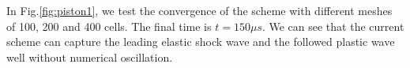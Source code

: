 \documentclass{article}
\numberwithin{equation}{section}
\numberwithin{table}{section}
\begin{document}
In Fig.\ref{fig:piston1}, we test the convergence of the scheme with different meshes of 100, 200 and 400 cells. The final time is $t = 150 \mu s $.  We can  see that the current scheme can capture the leading elastic shock wave and the followed plastic wave well without numerical oscillation.
\begin{figure}
\end{figure}
\end{document}
